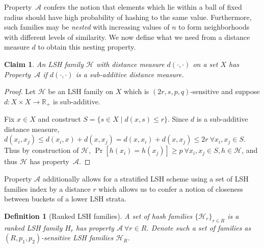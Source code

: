 \documentclass[a4paper]{article}
\theoremstyle{def}
\newtheorem{definition}{Definition}
\theoremstyle{thm}
\newtheorem{proposition}{Proposition}
\newtheorem{claim}[proposition]{Claim}
\newcommand{\R}[0]{\mathbb{R}}
\newcommand{\LSH}[0]{\mathcal{H}}
\begin{document}
Property~$\mathscr{A}$ confers the notion that elements which lie within a ball of fixed radius should have high probability of hashing to the same value.
Furthermore, such families may be \textit{nested} with increasing values of $n$ to form neighborhoods with different levels of similarity.
We now define what we need from a distance measure $d$ to obtain this nesting property.

\begin{claim}\label{prop:property_alpha}
    An LSH family $\LSH$ with distance measure $d(\cdot, \cdot)$ on a set $X$ has Property~$\mathscr{A}$ if $d(\cdot, \cdot)$ is a sub-additive distance measure.
\end{claim}

\begin{proof}
    Let $\LSH$ be an LSH family on $X$ which is $(2r, s, p, q)$-sensitive and suppose $d: X \times X \rightarrow \R_+$ is sub-additive.

    Fix $x \in X$ and construct $S = \{s \in X \mid d(x,s) \le r\}$.
    Since $d$ is a sub-additive distance measure, $d(x_i, x_j) \le d(x_i,x) + d(x,x_j) = d(x,x_i) + d(x,x_j) \le 2r~\forall x_i,x_j \in S$.
    Thus by construction of $\LSH$, $\Pr[h(x_i) = h(x_j)] \ge p~\forall x_i, x_j \in S, h \in \LSH$, and thus $\LSH$ has property~$\mathscr{A}$.
\end{proof}

Property $\mathscr{A}$ additionally allows for a stratified LSH scheme using a set of LSH families index by a distance $r$ which allows us to confer a notion of closeness between buckets of a lower LSH strata.

\begin{definition}[Ranked LSH families]\label{defn:ranked_lsh}
    A set of hash families ${\{{\LSH}_r\}}_{r\in R}$ is a ranked LSH family $H_r$ has property $\mathscr{A}~\forall r \in R$.
    Denote such a set of families as $(R,p_1, p_2)$-sensitive LSH families ${\LSH}_R$.
\end{definition}

\end{document}
